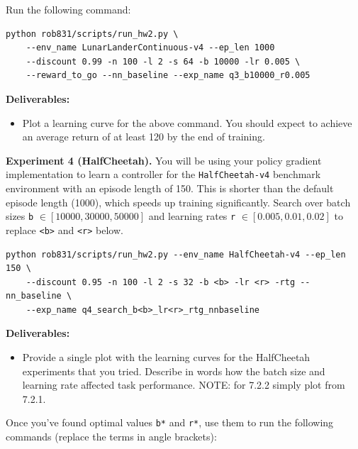 \documentclass{article}
\begin{document}
Run the following command:
\begin{lstlisting}
python rob831/scripts/run_hw2.py \
    --env_name LunarLanderContinuous-v4 --ep_len 1000
    --discount 0.99 -n 100 -l 2 -s 64 -b 10000 -lr 0.005 \
    --reward_to_go --nn_baseline --exp_name q3_b10000_r0.005
\end{lstlisting}

\textbf{Deliverables:}
\begin{itemize}
    \item Plot a learning curve for the above command. You should expect to achieve an average return of at least 120 by the end of training.
\end{itemize}

\vspace{0.1in}
\textbf{Experiment 4 (HalfCheetah).} You will be using your policy gradient implementation to learn a controller for the \verb|HalfCheetah-v4| benchmark environment with an episode length of 150. This is shorter than the default episode length (1000), which speeds up training significantly.
Search over batch sizes \texttt{b} $\in [10000,30000,50000]$ and learning rates \texttt{r} $\in [0.005, 0.01, 0.02]$ to replace \texttt{<b>} and \texttt{<r>} below. 
\begin{lstlisting}
python rob831/scripts/run_hw2.py --env_name HalfCheetah-v4 --ep_len 150 \ 
    --discount 0.95 -n 100 -l 2 -s 32 -b <b> -lr <r> -rtg --nn_baseline \ 
    --exp_name q4_search_b<b>_lr<r>_rtg_nnbaseline
\end{lstlisting}
\textbf{Deliverables:}
\begin{itemize}
    \item Provide a single plot with the learning curves for the HalfCheetah experiments that you tried. Describe in words how the batch size and learning rate affected task performance. NOTE: for 7.2.2 simply plot from 7.2.1.
\end{itemize}

Once you've found optimal values \texttt{b*} and \texttt{r*}, use them to run the following commands (replace the terms in angle brackets):
\end{document}
